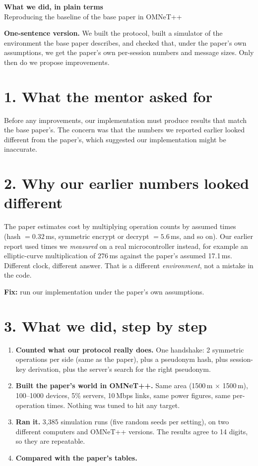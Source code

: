 \documentclass[11pt]{article}
\begin{document}
{\LARGE\bfseries What we did, in plain terms}\\[2pt]
{\large Reproducing the baseline of the base paper in OMNeT++}

\vspace{4pt}
\begin{key}
\textbf{One-sentence version.} We built the protocol, built a simulator of the environment the base paper describes, and checked that, under the paper's own assumptions, we get the paper's own per-session numbers and message sizes. Only then do we propose improvements.
\end{key}

\section*{1. What the mentor asked for}
Before any improvements, our implementation must produce results that match the base paper's. The concern was that the numbers we reported earlier looked different from the paper's, which suggested our implementation might be inaccurate.

\section*{2. Why our earlier numbers looked different}
The paper estimates cost by multiplying operation counts by assumed times (hash $=0.32$\,ms, symmetric encrypt or decrypt $=5.6$\,ms, and so on). Our earlier report used times we \emph{measured} on a real microcontroller instead, for example an elliptic-curve multiplication of 276\,ms against the paper's assumed 17.1\,ms. Different clock, different answer. That is a different \emph{environment}, not a mistake in the code.

\textbf{Fix:} run our implementation under the paper's own assumptions.

\section*{3. What we did, step by step}
\begin{enumerate}[leftmargin=1.4em,itemsep=2pt]
\item \textbf{Counted what our protocol really does.} One handshake: 2 symmetric operations per side (same as the paper), plus a pseudonym hash, plus session-key derivation, plus the server's search for the right pseudonym.
\item \textbf{Built the paper's world in OMNeT++.} Same area (1500\,m $\times$ 1500\,m), 100--1000 devices, 5\% servers, 10\,Mbps links, same power figures, same per-operation times. Nothing was tuned to hit any target.
\item \textbf{Ran it.} 3,385 simulation runs (five random seeds per setting), on two different computers and OMNeT++ versions. The results agree to 14 digits, so they are repeatable.
\item \textbf{Compared with the paper's tables.}
\end{enumerate}
\end{document}

